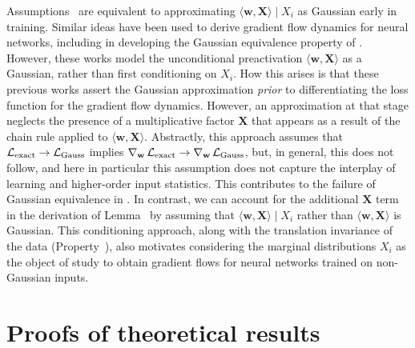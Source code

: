 Assumptions~ are equivalent to approximating $\langle \mathbf{w}, \mathbf{X} \rangle \mid X_i$ as Gaussian early in training.
Similar ideas have been used to derive gradient flow dynamics for neural networks, including in developing the Gaussian equivalence property of \cite{goldt2020modelling,gerace2020generalisation,goldt2022gaussian}.
However, these works model the unconditional preactivation $\langle \mathbf{w}, \mathbf{X} \rangle$ as a Gaussian, rather than first conditioning on $X_i$.
How this arises is that these previous works assert the Gaussian approximation \emph{prior} to differentiating the loss function for the gradient flow dynamics.
However, an approximation at that stage neglects the presence of a multiplicative factor $\mathbf{X}$ that appears as a result of the chain rule applied to $\langle \mathbf{w}, \mathbf{X} \rangle$.
Abstractly, this approach assumes that $\operatorname{\mathcal{L}}_\text{exact} \to \operatorname{\mathcal{L}}_\text{Gauss}$ implies $\nabla_\mathbf{w} \operatorname{\mathcal{L}}_\text{exact} \to \nabla_\mathbf{w} \operatorname{\mathcal{L}}_\text{Gauss}$, but, in general, this does not follow, and here in particular this assumption does not capture the interplay of learning and higher-order input statistics. %
This contributes to the failure of Gaussian equivalence in \cite{ingrosso2022data}.
In contrast, we can account for the additional $\mathbf{X}$ term in the derivation of 
Lemma~ by assuming that $\langle \mathbf{w}, \mathbf{X} \rangle \mid X_i$ rather than $\langle \mathbf{w}, \mathbf{X} \rangle$ is Gaussian.
This conditioning approach, along with the translation invariance of the data (Property~), also motivates considering the marginal distributions $X_i$ as the object of study to obtain gradient flows for neural networks trained on non-Gaussian inputs.

\section{Proofs of theoretical results}
\label{app:proofs}

